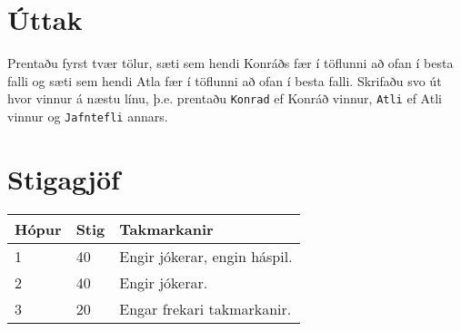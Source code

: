 \section*{Úttak}
Prentaðu fyrst tvær tölur, sæti sem hendi Konráðs fær í töflunni að ofan í besta falli og sæti sem hendi Atla fær í töflunni að ofan í besta falli.
Skrifaðu svo út hvor vinnur á næstu línu, þ.e. prentaðu \texttt{Konrad} ef Konráð vinnur, \texttt{Atli} ef Atli vinnur og \texttt{Jafntefli} annars.

\section*{Stigagjöf}
\begin{tabular}{|l|l|l|}
\hline
Hópur & Stig & Takmarkanir \\ \hline
1     & 40   & Engir jókerar, engin háspil. \\ \hline
2     & 40   & Engir jókerar. \\ \hline
3     & 20   & Engar frekari takmarkanir. \\ \hline
\end{tabular}

